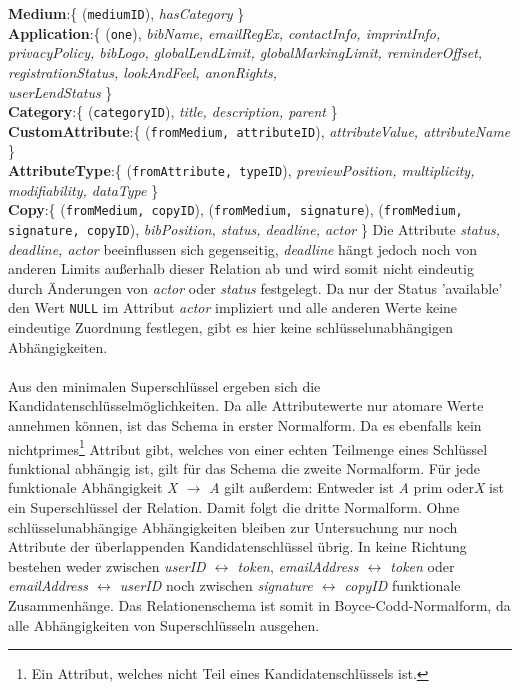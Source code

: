 \documentclass{article}
\begin{document}
\textbf{Medium}:\{ (\texttt{mediumID}), \textit{hasCategory} \}\\
\textbf{Application}:\{ (\texttt{one}),\textit{ bibName, emailRegEx, contactInfo, imprintInfo, privacyPolicy, bibLogo, globalLendLimit, globalMarkingLimit, reminderOffset, registrationStatus, lookAndFeel, anonRights,\\ userLendStatus} \}\\
\textbf{Category}:\{ (\texttt{categoryID}), \textit{title, description, parent} \}\\
\textbf{CustomAttribute}:\{ (\texttt{fromMedium, attributeID}),  \textit{attributeValue, attributeName} \}\\
\textbf{AttributeType}:\{ (\texttt{fromAttribute, typeID}), \textit{previewPosition, multiplicity, modifiability, dataType} \}\\
\textbf{Copy}:\{ (\texttt{fromMedium, copyID}), (\texttt{fromMedium, signature}), (\texttt{fromMedium, signature, copyID}), \textit{bibPosition, status, deadline, actor} \}
Die Attribute \textit{status, deadline, actor} beeinflussen sich gegenseitig, \textit{deadline} hängt jedoch noch von anderen Limits außerhalb dieser Relation ab und wird somit nicht eindeutig durch Änderungen von \textit{actor} oder \textit{status} festgelegt. Da nur der Status 'available' den Wert \texttt{NULL} im Attribut \textit{actor} impliziert und alle anderen Werte keine eindeutige Zuordnung festlegen, gibt es hier keine schlüsselunabhängigen Abhängigkeiten.\\
\\
Aus den minimalen Superschlüssel ergeben sich die Kandidatenschlüsselmöglichkeiten. Da alle Attributewerte nur atomare Werte annehmen können, ist das Schema in erster Normalform. Da es ebenfalls kein nichtprimes\footnote{Ein Attribut, welches nicht Teil eines Kandidatenschlüssels ist.} Attribut gibt, welches von einer echten Teilmenge eines Schlüssel funktional abhängig ist, gilt für das Schema die zweite Normalform. Für jede funktionale Abhängigkeit \textit{X $\rightarrow$ A} gilt außerdem: Entweder ist \textit{A} prim oder\textit{X} ist ein Superschlüssel der Relation. Damit folgt die dritte Normalform. Ohne schlüsselunabhängige Abhängigkeiten bleiben zur Untersuchung nur noch Attribute der überlappenden Kandidatenschlüssel übrig. In keine Richtung bestehen weder zwischen \textit{userID $\leftrightarrow$ token}, \textit{emailAddress $\leftrightarrow$ token} oder \textit{emailAddress $\leftrightarrow$ userID} noch zwischen \textit{signature $\leftrightarrow$ copyID} funktionale Zusammenhänge. Das Relationenschema ist somit in Boyce-Codd-Normalform, da alle Abhängigkeiten von Superschlüsseln ausgehen.
\end{document}
